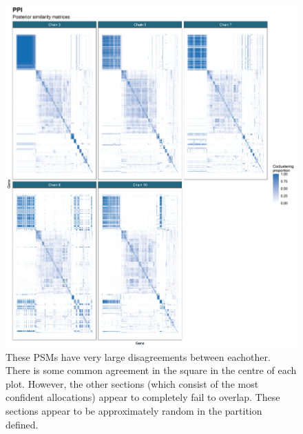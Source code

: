 \documentclass[]{article}
\begin{document}
\begin{figure}
	\centering
	\includegraphics[scale=0.5]{./Images/Yeast/PPIPSMcomparisonReduced.png}
	\caption{These PSMs have very large disagreements between eachother. There is some common agreement in the square in the centre of each plot. However, the other sections (which consist of the most confident allocations) appear to completely fail to overlap. These sections appear to be approximately random in the partition defined.}
	\label{fig:ppiPSMs}
\end{figure}
\end{document}
